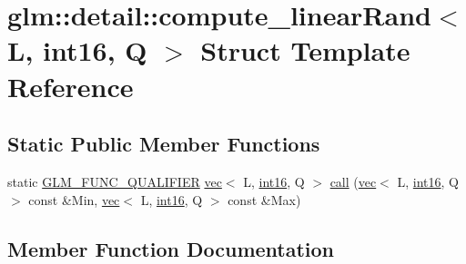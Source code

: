 \hypertarget{structglm_1_1detail_1_1compute__linear_rand_3_01_l_00_01int16_00_01_q_01_4}{}\section{glm\+:\+:detail\+:\+:compute\+\_\+linear\+Rand$<$ L, int16, Q $>$ Struct Template Reference}
\label{structglm_1_1detail_1_1compute__linear_rand_3_01_l_00_01int16_00_01_q_01_4}
\subsection*{Static Public Member Functions}
\begin{DoxyCompactItemize}
\item 
static \hyperlink{setup_8hpp_a33fdea6f91c5f834105f7415e2a64407}{G\+L\+M\+\_\+\+F\+U\+N\+C\+\_\+\+Q\+U\+A\+L\+I\+F\+I\+ER} \hyperlink{structglm_1_1vec}{vec}$<$ L, \hyperlink{namespaceglm_1_1detail_a375938874ca4f0a0982ec6373b56117b}{int16}, Q $>$ \hyperlink{structglm_1_1detail_1_1compute__linear_rand_3_01_l_00_01int16_00_01_q_01_4_a9a3d3514acfa5f0895c900485d754a18}{call} (\hyperlink{structglm_1_1vec}{vec}$<$ L, \hyperlink{namespaceglm_1_1detail_a375938874ca4f0a0982ec6373b56117b}{int16}, Q $>$ const \&Min, \hyperlink{structglm_1_1vec}{vec}$<$ L, \hyperlink{namespaceglm_1_1detail_a375938874ca4f0a0982ec6373b56117b}{int16}, Q $>$ const \&Max)
\end{DoxyCompactItemize}


\subsection{Member Function Documentation}
\mbox{\label{structglm_1_1detail_1_1compute__linear_rand_3_01_l_00_01int16_00_01_q_01_4_a9a3d3514acfa5f0895c900485d754a18}} 
